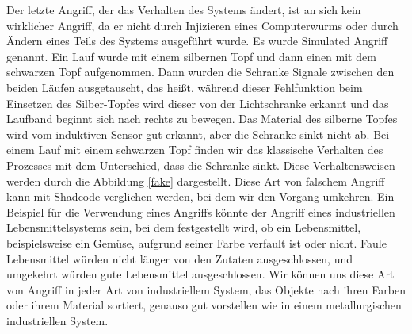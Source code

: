 \documentclass[12pt,a4paper]{scrartcl}
\numberwithin{equation}{section}
\begin{document}
Der letzte Angriff, der das Verhalten des Systems ändert, ist an sich kein wirklicher Angriff, da er nicht durch Injizieren eines Computerwurms oder durch Ändern eines Teils des Systems ausgeführt wurde. Es wurde Simulated Angriff genannt. Ein Lauf wurde mit einem silbernen Topf und dann einen mit dem schwarzen Topf aufgenommen. Dann wurden die Schranke Signale zwischen den beiden Läufen ausgetauscht, das heißt, während dieser Fehlfunktion beim Einsetzen des Silber-Topfes wird dieser von der Lichtschranke erkannt und das Laufband beginnt sich nach rechts zu bewegen. Das Material des silberne Topfes wird vom induktiven Sensor gut erkannt, aber die Schranke sinkt nicht ab. Bei einem Lauf mit einem schwarzen Topf finden wir das klassische Verhalten des Prozesses mit dem Unterschied, dass die Schranke sinkt. Diese Verhaltensweisen werden durch die Abbildung \ref{fake} dargestellt. Diese Art von falschem Angriff kann mit Shadcode verglichen werden, bei dem wir den Vorgang umkehren. Ein Beispiel für die Verwendung eines Angriffs könnte der Angriff eines industriellen Lebensmittelsystems sein, bei dem festgestellt wird, ob ein Lebensmittel, beispielsweise ein Gemüse, aufgrund seiner Farbe verfault ist oder nicht. Faule Lebensmittel würden nicht länger von den Zutaten ausgeschlossen, und umgekehrt würden gute Lebensmittel ausgeschlossen. Wir können uns diese Art von Angriff in jeder Art von industriellem System, das Objekte nach ihren Farben oder ihrem Material sortiert, genauso gut vorstellen wie in einem metallurgischen industriellen System. 
\end{document}
